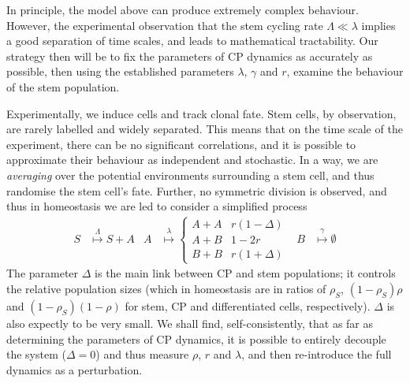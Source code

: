 \documentclass[10pt,UKenglish]{article}
\begin{document}
In principle, the model above can produce extremely complex behaviour. However,
the experimental observation that the stem cycling rate $\Lambda \ll \lambda$
implies a good separation of time scales, and leads to mathematical
tractability. Our strategy then will be to fix the parameters of CP dynamics as
accurately as possible, then using the established parameters $\lambda$,
$\gamma$ and $r$, examine the behaviour of the stem population.

Experimentally, we induce cells and track clonal fate. Stem cells, by
observation, are rarely labelled and widely separated. This means that on the
time scale of the experiment, there can be no significant correlations, and it
is possible to approximate their behaviour as independent and stochastic. In a
way, we are \emph{averaging} over the potential environments surrounding a stem
cell, and thus randomise the stem cell's fate. Further, no symmetric division is
observed, and thus in homeostasis we are led to consider a simplified process
\begin{align}
S &\overset{\Lambda}{\longmapsto} S+A & A &\overset{\lambda}{\longmapsto} \begin{cases}
A+A & r(1-\Delta) \\
A+B & 1-2r \\
B+B & r(1+\Delta)\end{cases} & B &\overset{\gamma}{\longmapsto} \emptyset
\label{eq:full-model}
\end{align}
The parameter $\Delta$ is the main link between CP and stem populations; it
controls the relative population sizes (which in homeostasis are in ratios of
$\rho_S$, $(1-\rho_S)\rho$ and $(1-\rho_S)(1-\rho)$ for stem, CP and
differentiated cells, respectively). $\Delta$ is also expectly to be very small.
We shall find, self-consistently, that as far as determining the parameters of
CP dynamics, it is possible to entirely decouple the system ($\Delta = 0$) and
thus measure $\rho$, $r$ and $\lambda$, and then re-introduce the full dynamics
as a perturbation.
\end{document}
